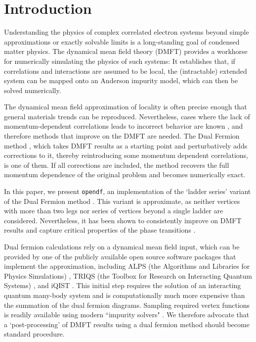 \documentclass[3p,times,procedia]{elsarticle}
\begin{document}
\vspace*{-8pt}
\linenumbers

\listoftodos
\section{Introduction}

Understanding the physics of complex correlated electron systems beyond simple approximations or exactly solvable limits is a long-standing goal of condensed matter physics. The dynamical mean field theory (DMFT) \cite{MetznerVollhardt:1989,MH89,Georges92,Jarrell92,Georges1996,KotliarSavrasov:2006} provides a workhorse for numerically simulating the physics of such systems: It establishes that, if correlations and interactions are assumed to be local, the (intractable) extended system can be mapped onto an  Anderson impurity model, which can then be solved numerically.

The dynamical mean field approximation of locality is often precise enough that general materials trends can be reproduced. Nevertheless, cases where the lack of momentum-dependent correlations leads to incorrect behavior are known \cite{SomePGReference}, and therefore methods that improve on the DMFT are needed. The Dual Fermion method \cite{Rubtsov2008}, which takes DMFT results as a starting point and perturbatively adds corrections to it, thereby reintroducing some momentum dependent correlations, is one of them. If all corrections are included, the method recovers the full momentum dependence of the original problem and becomes numerically exact.

In this paper, we present \texttt{opendf}, an implementation of the `ladder series' variant of the Dual Fermion method \cite{HafermannLi:2009}. This variant is  approximate, as neither vertices with more than two legs nor series of vertices beyond a single ladder are considered. Nevertheless, it has been shown to consistently improve on DMFT results \cite{Rubtsov2008,HafermannLi:2009,Li2014,Otsuki2014} and capture critical properties of the phase transitions \cite{Antipov2014}.

Dual fermion calculations rely on a dynamical mean field input, which can be provided by one of the publicly available open source software packages that implement the approximation, including ALPS (the Algorithms and Libraries for Physics Simulations) \cite{ALPS2}, TRIQS (the Toolbox for Research on Interacting Quantum Systems) \cite{TRIQS}, and iQIST \cite{iQIST}.
This initial step requires the solution of an interacting quantum many-body system and is computationally much more expensive than the summation of the dual fermion diagrams. Sampling required vertex functions is readily available using modern ``impurity solvers" \cite{Hafermann2013a,Gull2008b}. We therefore advocate that a `post-processing' of DMFT results using a dual fermion method should become standard procedure.
\end{document}
